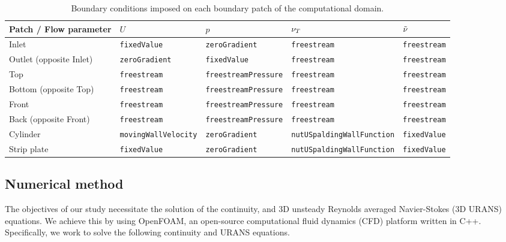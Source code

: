 \documentclass[a4paper,fleqn]{cas-sc}
\begin{document}
\begin{table}[width=1\linewidth,cols=5,pos=h]
  \color{blue}
  \caption{Boundary conditions imposed on each boundary patch of the computational domain.} \label{tab:boundConds}
\begin{tabular*}{\tblwidth}{@{} LLLLL@{} }
\toprule
Patch / Flow parameter  & $U$                       & $p$                       & $\nu_{T}$                          & $\tilde{\nu}$        \\
\midrule
Inlet                   & \verb|fixedValue|         & \verb|zeroGradient|       & \verb|freestream|               & \verb|freestream| \\
Outlet (opposite Inlet) & \verb|zeroGradient|       & \verb|fixedValue|         & \verb|freestream|               & \verb|freestream| \\
Top                     & \verb|freestream|         & \verb|freestreamPressure| & \verb|freestream|               & \verb|freestream| \\
Bottom (opposite Top)   & \verb|freestream|         & \verb|freestreamPressure| & \verb|freestream|               & \verb|freestream| \\
Front                   & \verb|freestream|         & \verb|freestreamPressure| & \verb|freestream|               & \verb|freestream| \\
Back (opposite Front)   & \verb|freestream|         & \verb|freestreamPressure| & \verb|freestream|               & \verb|freestream| \\
Cylinder                & \verb|movingWallVelocity| & \verb|zeroGradient|       & \verb|nutUSpaldingWallFunction| & \verb|fixedValue| \\
Strip plate             & \verb|fixedValue|         & \verb|zeroGradient|       & \verb|nutUSpaldingWallFunction| & \verb|fixedValue| \\
\bottomrule
\end{tabular*}
\end{table}
\color{black}

\subsection{Numerical method} \label{ssec:numMeth}
The objectives of our study necessitate the solution of the continuity, and 3D unsteady Reynolds averaged Navier-Stokes (3D URANS) equations. We achieve this by using OpenFOAM, an open-source computational fluid dynamics (CFD) platform written in C++. Specifically, we work to solve the following continuity and URANS equations.
\end{document}
